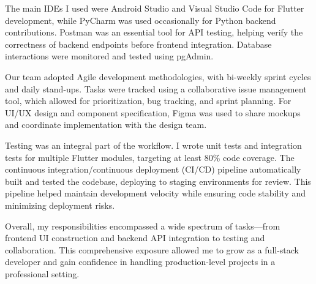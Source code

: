 The main IDEs I used were Android Studio and Visual Studio Code for Flutter development, while PyCharm was used occasionally for Python backend contributions. Postman was an essential tool for API testing, helping verify the correctness of backend endpoints before frontend integration. Database interactions were monitored and tested using pgAdmin.

Our team adopted Agile development methodologies, with bi-weekly sprint cycles and daily stand-ups. Tasks were tracked using a collaborative issue management tool, which allowed for prioritization, bug tracking, and sprint planning. For UI/UX design and component specification, Figma was used to share mockups and coordinate implementation with the design team.

Testing was an integral part of the workflow. I wrote unit tests and integration tests for multiple Flutter modules, targeting at least 80\% code coverage. The continuous integration/continuous deployment (CI/CD) pipeline automatically built and tested the codebase, deploying to staging environments for review. This pipeline helped maintain development velocity while ensuring code stability and minimizing deployment risks.

Overall, my responsibilities encompassed a wide spectrum of tasks—from frontend UI construction and backend API integration to testing and collaboration. This comprehensive exposure allowed me to grow as a full-stack developer and gain confidence in handling production-level projects in a professional setting.
